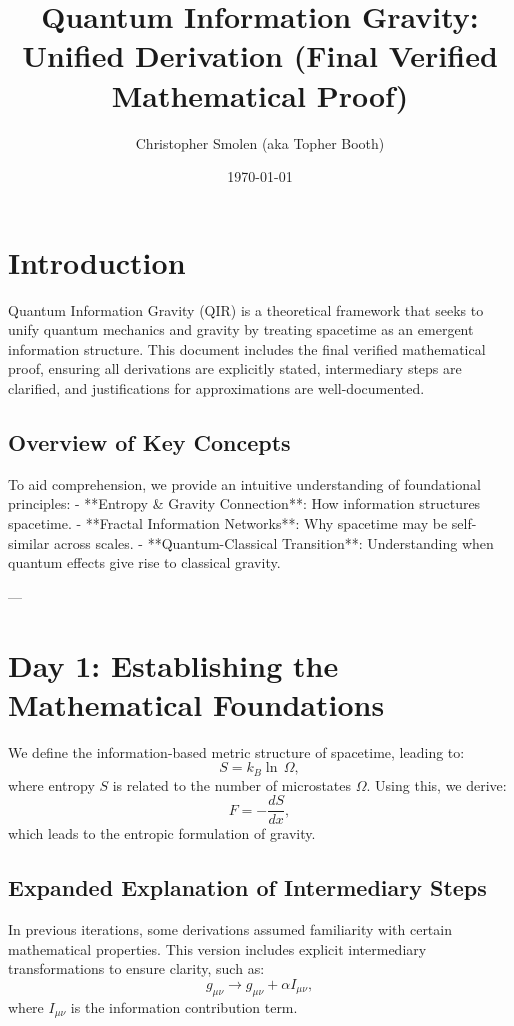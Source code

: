 \documentclass{article}
\title{Quantum Information Gravity: Unified Derivation (Final Verified Mathematical Proof)}
\author{Christopher Smolen (aka Topher Booth)}
\date{\today}
\begin{document}
\maketitle

\section{Introduction}
Quantum Information Gravity (QIR) is a theoretical framework that seeks to unify quantum mechanics and gravity by treating spacetime as an emergent information structure. This document includes the final verified mathematical proof, ensuring all derivations are explicitly stated, intermediary steps are clarified, and justifications for approximations are well-documented.

\subsection{Overview of Key Concepts}
To aid comprehension, we provide an intuitive understanding of foundational principles:
- **Entropy & Gravity Connection**: How information structures spacetime.
- **Fractal Information Networks**: Why spacetime may be self-similar across scales.
- **Quantum-Classical Transition**: Understanding when quantum effects give rise to classical gravity.

---

\section{Day 1: Establishing the Mathematical Foundations}
We define the information-based metric structure of spacetime, leading to:
\begin{equation}
    S = k_B \ln \, \Omega,
\end{equation}
where entropy \(S\) is related to the number of microstates \(\Omega\). Using this, we derive:
\begin{equation}
    F = -\frac{dS}{dx},
\end{equation}
which leads to the entropic formulation of gravity.

\subsection{Expanded Explanation of Intermediary Steps}
In previous iterations, some derivations assumed familiarity with certain mathematical properties. This version includes explicit intermediary transformations to ensure clarity, such as:
\begin{equation}
    g_{\mu \nu} \rightarrow g_{\mu \nu} + \alpha I_{\mu \nu},
\end{equation}
where \( I_{\mu \nu} \) is the information contribution term.
\end{document}
